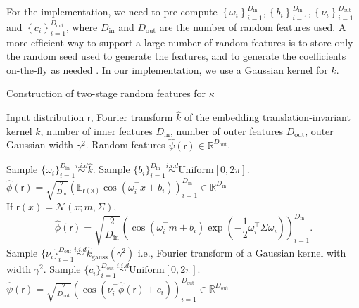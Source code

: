 \documentclass[english]{article}
\theoremstyle{plain}
\theoremstyle{plain}
\begin{document}
For the implementation, we need to pre-compute $\left\{ \omega_{i}\right\} _{i=1}^{D_\mathrm{in}},\left\{ b_{i}\right\} _{i=1}^{D_\mathrm{in}},\left\{ \nu_{i}\right\} _{i=1}^{D_\mathrm{out}}$
and $\left\{ c_{i}\right\} _{i=1}^{D_\mathrm{out}}$, where $D_\mathrm{in}$ and
$D_\mathrm{out}$ are the number of random features used. 
A more efficient way to support a large number of random features 
is to store only the random seed used to generate 
the features, and to generate the coefficients  on-the-fly as needed \citep{Dai2014}. 
In our implementation, we use a Gaussian kernel for $k$.



\begin{algorithm}[t]
\caption{Construction of two-stage random features for $\kappa$}
\label{algo:random_features_kgg}
\begin{algorithmic}[1]
\REQUIRE Input distribution $\mathsf{r}$, Fourier transform $\hat{k}$ of 
the embedding translation-invariant kernel $k$, number of inner features $D_\mathrm{in}$, number of outer features $D_\mathrm{out}$, outer Gaussian width $\gamma^2$.
\ENSURE Random features $\hat{\psi}(\mathsf{r}) \in \mathbb{R}^{D_\mathrm{out}}$. 

\STATE Sample  $\{ \omega_i \}_{i=1}^{D_\mathrm{in}} \overset{i.i.d}{\sim} \hat{k}$.
\STATE Sample $\{b_i\}_{i=1}^{D_\mathrm{in}} \overset{i.i.d}{\sim} \text{Uniform}[0, 2\pi] $.
\STATE $\hat{\phi}(\mathsf{r}) = \sqrt{\frac{2}{D_\mathrm{in}}} \left( \mathbb{E}_{\mathsf{r(x)}} 
\cos(\omega_{i}^{\top}x+b_{i} ) \right)_{i=1}^{D_\mathrm{in}} \in \mathbb{R}^{D_\mathrm{in}}$ \\
If $\mathsf{r}(x)=\mathcal{N}(x;m, \Sigma )$, 
\small
\begin{equation*}
\hat{\phi}( \mathsf{r}) = \sqrt{\frac{2}{D_\mathrm{in}}} \left( \cos(\omega_{i}^{\top}m +b_{i}) \exp 
\left(-\frac{1}{2}\omega_{i}^{\top}\Sigma \omega_{i} \right) \right)_{i=1}^{D_\mathrm{in}}.
\end{equation*}
%
\STATE Sample $\{ \nu_i \}_{i=1}^{D_\mathrm{out}} \overset{i.i.d}{\sim} \hat{k}_{\text{gauss}}(\gamma^{2})$
i.e., Fourier transform of a Gaussian kernel with width $\gamma^2$.
\STATE Sample $\{c_i\}_{i=1}^{D_\mathrm{out}} \overset{i.i.d}{\sim} \text{Uniform}[0, 2\pi] $.
\STATE $\hat{\psi}(\mathsf{r}) = \sqrt{\frac{2}{D_\mathrm{out}}} \left(  
\cos(\nu_{i}^{\top} \hat{\phi}(\mathsf{r}) + c_{i} ) \right)_{i=1}^{D_\mathrm{out}} \in 
\mathbb{R}^{D_\mathrm{out}}$
\end{algorithmic}
\end{algorithm}
\end{document}
